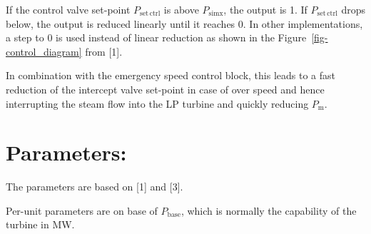 \documentclass[
  a4paper,
  DIV=11,
  numbers=noendperiod]{scrartcl}
\begin{document}
If the control valve set-point \(P_\mathrm{set\,ctrl}\) is above
\(P_\mathrm{simx}\), the output is 1. If \(P_\mathrm{set\,ctrl}\) drops
below, the output is reduced linearly until it reaches 0. In other
implementations, a step to 0 is used instead of linear reduction as
shown in the Figure~\ref{fig-control_diagram} from {[}1{]}.

In combination with the emergency speed control block, this leads to a
fast reduction of the intercept valve set-point in case of over speed
and hence interrupting the steam flow into the LP turbine and quickly
reducing \(P_\mathrm{m}\).

\section{Parameters:}\label{parameters}

The parameters are based on {[}1{]} and {[}3{]}.

Per-unit parameters are on base of \(P_\mathrm{base}\), which is
normally the capability of the turbine in MW.
\end{document}
